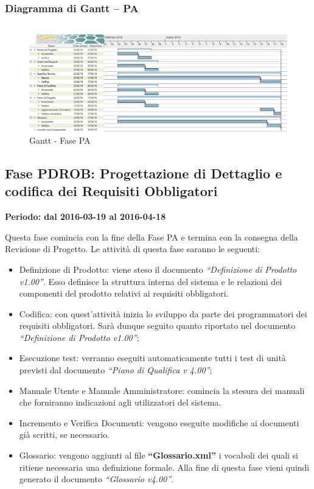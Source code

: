 \documentclass[../PianoProgetto.tex]{subfiles}
\begin{document}
		\subsubsection{Diagramma di Gantt – PA}
			\begin{figure}[!h]
				\centering
				\includegraphics[width=\textwidth]{gantt_png/3-progettazione_architetturale}
				\caption{Gantt - Fase PA}
				\label{fig:Gantt - Fase PA}
			\end{figure}
			
	\subsection{Fase PDROB: Progettazione di Dettaglio e codifica dei Requisiti Obbligatori}
		\textbf{Periodo: dal 2016-03-19 al 2016-04-18}
		
		Questa fase comincia con la fine della Fase PA e termina con la consegna della Revisione di Progetto. Le attività di questa fase saranno le seguenti:
		\begin{itemize}
			\item Definizione di Prodotto: viene steso il documento \textit{“Definizione di Prodotto v1.00”}. Esso definisce la struttura interna del sistema e le relazioni dei componenti del prodotto relativi ai requisiti obbligatori.

			\item Codifica: con quest’attività inizia lo sviluppo da parte dei programmatori dei requisiti obbligatori. Sarà dunque seguito quanto riportato nel documento \textit{“Definizione di Prodotto v1.00”};

			\item Esecuzione test: verranno eseguiti automaticamente tutti i test di unità previsti dal documento \textit{“Piano di Qualifica v 4.00”};

			\item Manuale Utente e Manuale Amministratore: comincia la stesura dei manuali che forniranno indicazioni agli utilizzatori del sistema.

			\item Incremento e Verifica Documenti: vengono eseguite modifiche ai documenti già scritti, se necessario.

			\item Glossario: vengono aggiunti al file \textbf{“Glossario.xml”} i vocaboli dei quali si ritiene necessaria una definizione formale. Alla fine di questa fase vieni quindi generato il documento \textit{“Glossario v4.00”}.
		\end{itemize}
\end{document}
